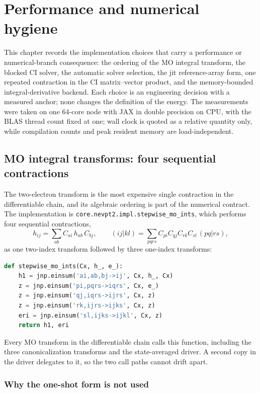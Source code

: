\chapter{Performance and numerical hygiene}
\label{ch:performance}

This chapter records the implementation choices that carry a performance
or numerical-branch consequence: the ordering of the MO integral
transform, the blocked CI solver, the automatic solver selection, the
jit reference-array form, one repeated contraction in the CI
matrix--vector product, and the memory-bounded integral-derivative
backend.  Each choice is an engineering decision with a measured
anchor; none changes the definition of the energy.  The
measurements were taken on one 64-core node with JAX in double
precision on CPU, with the BLAS thread count fixed at one; wall clock
is quoted as a relative quantity only, while compilation counts and
peak resident memory are load-independent.

\section{MO integral transforms: four sequential contractions}

The two-electron transform is the most expensive single contraction in
the differentiable chain, and its algebraic ordering is part of the
numerical contract.  The implementation is
\texttt{core.nevpt2.impl.stepwise\_mo\_ints}, which performs four
sequential contractions,
\begin{equation}
  h_{ij} = \sum_{ab} C_{ai}\, h_{ab}\, C_{bj},
  \qquad
  (ij|kl) = \sum_{pqrs} C_{pi} C_{qj} C_{rk} C_{sl}\, (pq|rs),
\end{equation}
as one two-index transform followed by three one-index transforms:
\begin{lstlisting}[language=Python]
def stepwise_mo_ints(Cx, h_, e_):
    h1 = jnp.einsum('ai,ab,bj->ij', Cx, h_, Cx)
    z = jnp.einsum('pi,pqrs->iqrs', Cx, e_)
    z = jnp.einsum('qj,iqrs->ijrs', Cx, z)
    z = jnp.einsum('rk,ijrs->ijks', Cx, z)
    eri = jnp.einsum('sl,ijks->ijkl', Cx, z)
    return h1, eri
\end{lstlisting}

Every MO transform in the differentiable chain calls this function,
including the three canonicalization transforms and the state-averaged
driver.  A second copy in the driver delegates to it, so the two
call paths cannot drift apart.

\subsection{Why the one-shot form is not used}

